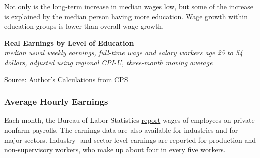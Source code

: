 \documentclass{report}
\makeatletter
\newcommand{\tbllink}[1]{\href{https://raw.githubusercontent.com/bdecon/US-chartbook/master/chartbook/data/#1}{\faTable}}
\newcommand*\short[1]{\expandafter\@gobbletwo\number\numexpr#1\relax}
\newcommand{\stdnode}[3]{\node[below, align=left, shift=({#1,#2})]{#3};}
\newcommand{\dateaxisticks}{
		date coordinates in=x, axis line style={draw=none},
		xmax={2023-11-01},
		max space between ticks=40,	    
		xtick={{1990-01-01}, {1992-01-01}, {1994-01-01}, 
			{1996-01-01}, {1998-01-01}, {2000-01-01}, 
			{2002-01-01}, {2004-01-01}, {2006-01-01},
			{2008-01-01}, {2010-01-01}, {2012-01-01}, {2014-01-01},
		    {2016-01-01}, {2018-01-01}, {2020-01-01}, {2022-01-01}, 
		    {2024-01-01}, {2026-01-01}},
		minor xtick={{1989-01-01}, {1991-01-01}, {1993-01-01},
			{1995-01-01}, {1997-01-01}, {1999-01-01}, 
			{2001-01-01}, {2003-01-01}, {2005-01-01}, {2007-01-01},
		    {2009-01-01}, {2011-01-01}, {2013-01-01}, {2015-01-01},
		    {2017-01-01}, {2019-01-01}, {2021-01-01}, {2023-01-01}, 
		    {2025-01-01}, {2027-01-01}},
		enlarge y limits={0.06}, enlarge x limits={0.01},
		}
\newcommand{\thickline}[4]{\addplot[ultra thick, no markers, color=#1] 
		table [x=#2, y=#3, col sep=comma] {#4};	}
\newcommand{\rbars}{
		\fill[color=black!10] (axis cs:{1990-07-01},\pgfkeysvalueof{/pgfplots/ymin}) rectangle 
			(axis cs:{1991-03-01}, \pgfkeysvalueof{/pgfplots/ymax});
		\fill[color=black!10] (axis cs:{2007-12-01},\pgfkeysvalueof{/pgfplots/ymin}) rectangle 
			(axis cs:{2009-07-01}, \pgfkeysvalueof{/pgfplots/ymax});
		\fill[color=black!10] (axis cs:{2001-03-01},\pgfkeysvalueof{/pgfplots/ymin}) rectangle 
			(axis cs:{2001-11-01}, \pgfkeysvalueof{/pgfplots/ymax});
		\fill[color=black!10] (axis cs:{2020-02-01},\pgfkeysvalueof{/pgfplots/ymin}) rectangle 
			(axis cs:{2020-05-01}, \pgfkeysvalueof{/pgfplots/ymax});}
\makeatother
\begin{document}
{\begin{minipage}{0.76\textwidth}
Not only is the long-term increase in median wages low, but some of the increase is explained by the median person having more education. Wage growth within education groups is lower than overall wage growth. 
\vspace{1mm}

\normalsize \textbf{Real Earnings by Level of Education}\\
\footnotesize{\textit{median usual weekly earnings, full-time wage and salary workers age 25 to 54}}\\
\footnotesize{\textit{dollars, adjusted using regional CPI-U, three-month moving average}}
\vspace{6.1cm}

\hspace{6mm} 

\footnotesize{Source: Author's Calculations from CPS} \hfill \tbllink{educ_wage.csv}
\end{minipage}
\newpage
\begin{minipage}{0.76\textwidth}  
\subsubsection*{Average Hourly Earnings}
\small Each month, the Bureau of Labor Statistics \href{https://www.bls.gov/news.release/empsit.nr0.htm}{report} wages of employees on private nonfarm payrolls. The earnings data are also available for industries and for major sectors. Industry- and sector-level earnings are reported for production and non-supervisory workers, who make up about four in every five workers. 
\end{minipage}
\vspace{1mm}

}
\end{document}
